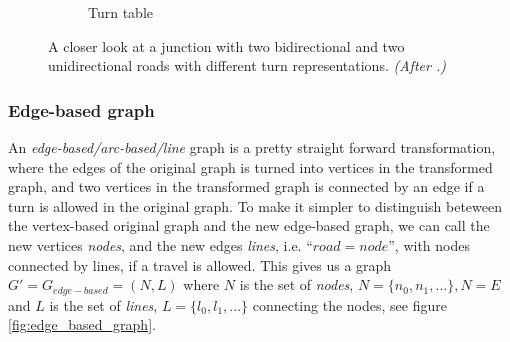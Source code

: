 \documentclass[../main.tex]{subfiles}
\begin{document}
\begin{figure}[h]
\begin{subfigure}[Turn table]{0.2\linewidth}
        \caption{Turn table}
        \label{fig:turns_d}
    \end{subfigure}
    \caption{A closer look at a junction with two bidirectional and two unidirectional roads with different turn representations. \textit{(After \cite[p.8]{crp-2013}.)}}
    \label{fig:turns}
\end{figure}

\subsubsection{Edge-based graph}
An \emph{edge-based/arc-based/line} graph is a pretty straight forward transformation, where the edges of the original graph is turned into vertices in the transformed graph, and two vertices in the transformed graph is connected by an edge if a turn is allowed in the original graph. To make it simpler to distinguish beteween the vertex-based original graph and the new edge-based graph, we can call the new vertices \emph{nodes}, and the new edges \emph{lines}, i.e. ``$road = node$'', with nodes connected by lines, if a travel is allowed. This gives us a graph $G' = G_{edge-based} = (N, L)$ where $N$ is the set of \emph{nodes}, $N = \{n_0,n_1, ...\}, N = E$ and $L$ is the set of \emph{lines}, $L = \{l_0, l_1,...\}$ connecting the nodes, see figure \ref{fig:edge_based_graph}.
\end{document}
